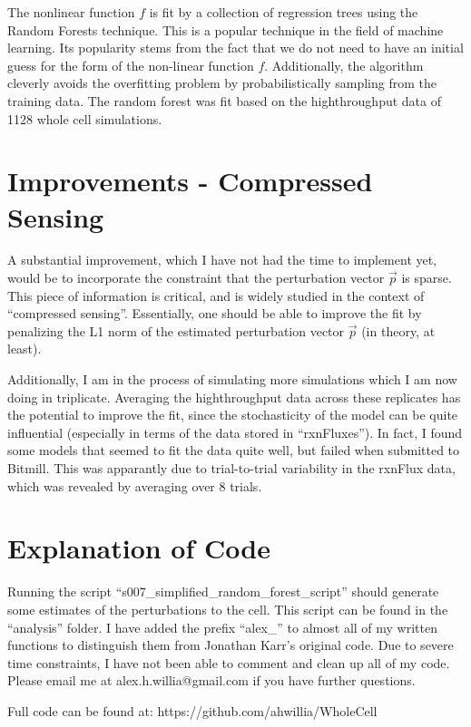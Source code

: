 \documentclass[12pt]{article}
\begin{document}
The nonlinear function $f$ is fit by a collection of regression trees using the Random Forests 
technique. This is a popular technique in the field of machine learning. Its popularity stems from the
fact that we do not need to have an initial guess for the form of the non-linear function $f$. Additionally,
the algorithm cleverly avoids the overfitting problem by probabilistically sampling from the training data.
The random forest was fit based on the highthroughput data of 1128 whole cell simulations.

\section{Improvements - Compressed Sensing}

A substantial improvement, which I have not had the time to implement yet, would be to incorporate
the constraint that the perturbation vector $\vec{p}$ is sparse. This piece of information is
critical, and is widely studied in the context of ``compressed sensing''. Essentially, one should
be able to improve the fit by penalizing the L1 norm of the estimated perturbation vector $\vec{p}$
(in theory, at least).

Additionally, I am in the process of simulating more simulations which I am now doing in triplicate.
Averaging the highthroughput data across these replicates has the potential to improve the fit, since
the stochasticity of the model can be quite influential (especially in terms of the data stored in
``rxnFluxes''). In fact, I found some models that seemed to fit the data quite well, but failed when
submitted to Bitmill. This was apparantly due to trial-to-trial variability in the rxnFlux data, which
was revealed by averaging over 8 trials.

\section{Explanation of Code}

Running the script ``s007\_simplified\_random\_forest\_script'' should generate some
estimates of the perturbations to the cell. This script can be found in the ``analysis''
folder. I have added the prefix ``alex\_'' to almost all of my written functions to
distinguish them from Jonathan Karr's original code. Due to severe time constraints,
I have not been able to comment and clean up all of my code. Please email me at
alex.h.willia@gmail.com if you have further questions.

Full code can be found at: https://github.com/ahwillia/WholeCell
\end{document}
